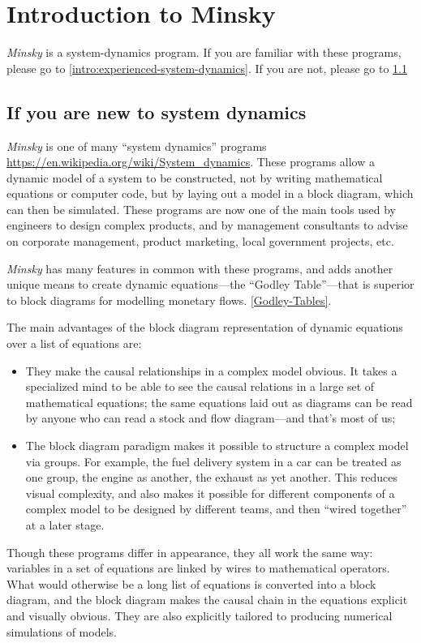 
\chapter{Introduction to Minsky}

\label{Introduction-Minsky}

\emph{Minsky} is a system-dynamics program. If you are familiar with
these programs, please go to \ref{intro:experienced-system-dynamics}.
If you are not, please go to \ref{intro:new-system-dynamics}

\section{If you are new to system dynamics}

\label{intro:new-system-dynamics}

\emph{Minsky} is one of many ``system dynamics'' programs \url{https://en.wikipedia.org/wiki/System_dynamics}.
These programs allow a dynamic model of a system to be constructed,
not by writing mathematical equations or computer code, but by laying
out a model in a block diagram, which can then be simulated. These
programs are now one of the main tools used by engineers to design
complex products, and by management consultants to advise on corporate
management, product marketing, local government projects, etc.

\emph{Minsky} has many features in common with these programs, and
adds another unique means to create dynamic equations---the ``Godley
Table''---that is superior to block diagrams for modelling monetary
flows. \ref{Godley-Tables}.

The main advantages of the block diagram representation of dynamic
equations over a list of equations are:
\begin{itemize}
\item They make the causal relationships in a complex model obvious. It
takes a specialized mind to be able to see the causal relations in
a large set of mathematical equations; the same equations laid out
as diagrams can be read by anyone who can read a stock and flow diagram---and
that's most of us; 
\item The block diagram paradigm makes it possible to structure a complex
model via groups. For example, the fuel delivery system in a car can
be treated as one group, the engine as another, the exhaust as yet
another. This reduces visual complexity, and also makes it possible
for different components of a complex model to be designed by different
teams, and then ``wired together'' at a later stage.
\end{itemize}
Though these programs differ in appearance, they all work the same
way: variables in a set of equations are linked by wires to mathematical
operators. What would otherwise be a long list of equations is converted
into a block diagram, and the block diagram makes the causal chain
in the equations explicit and visually obvious. They are also explicitly
tailored to producing numerical simulations of models.

